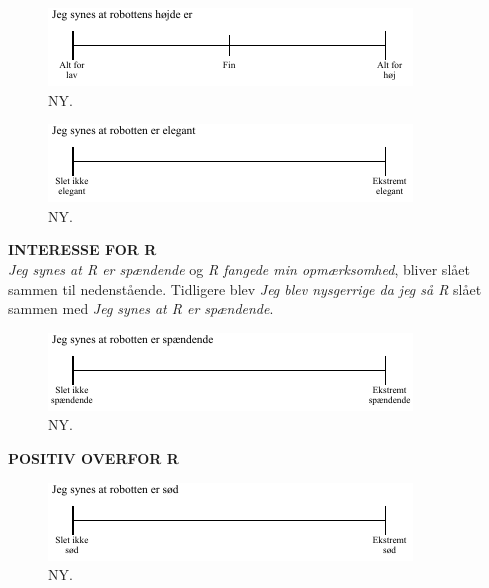 %
\begin{figure}[H]
\centering
\includegraphics[width =\textwidth]{Figure/UdvalgteSkalaer/HoejdeR} 
\caption{NY.}
\label{fig:SkalaHoejdeR}
\end{figure}
\noindent
%
%
\begin{figure}[H]
\centering
\includegraphics[width =\textwidth]{Figure/UdvalgteSkalaer/ElegantR} 
\caption{NY.}
\label{fig:SkalaElegantR}
\end{figure}
\noindent
%
\textbf{INTERESSE FOR R}\\
\textit{Jeg synes at R er spændende} og \textit{R fangede min opmærksomhed}, bliver slået sammen til nedenstående. Tidligere blev \textit{Jeg blev nysgerrige da jeg så R} slået sammen med \textit{Jeg synes at R er spændende}.
%
\begin{figure}[H]
\centering
\includegraphics[width =\textwidth]{Figure/UdvalgteSkalaer/RerSpaendende} 
\caption{NY.}
\label{fig:SkalaRerSpaendende}
\end{figure}
\noindent
%
\textbf{POSITIV OVERFOR R}\\
%
\begin{figure}[H]
\centering
\includegraphics[width =\textwidth]{Figure/UdvalgteSkalaer/SoedR} 
\caption{NY.}
\label{fig:SkalaSoedR}
\end{figure}
